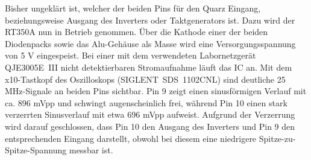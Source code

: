 \documentclass[]{article}
\begin{document}
	\noindent Bisher ungeklärt ist, welcher der beiden Pins für den Quarz Eingang, beziehungsweise Ausgang des Inverters oder Taktgenerators ist. %
	Dazu wird der RT350A nun in Betrieb genommen. Über die Kathode einer der beiden Diodenpacks sowie das Alu-Gehäuse als Masse wird eine Versorgungsspannung von 5 V eingespeist. Bei einer mit dem verwendeten Labornetzgerät QJE3005E~III nicht detektierbaren Stromaufnahme läuft das IC an. Mit dem x10-Tastkopf des Oszilloskops (SIGLENT~SDS~1102CNL) sind deutliche 25 MHz-Signale an beiden Pins sichtbar. Pin 9 zeigt einen sinusförmigen Verlauf mit ca. 896 mVpp und schwingt augenscheinlich frei, während Pin 10 einen stark verzerrten Sinusverlauf mit etwa 696 mVpp aufweist. Aufgrund der Verzerrung wird darauf geschlossen, dass Pin 10 den Ausgang des Inverters und Pin 9 den entsprechenden Eingang darstellt, obwohl bei diesem eine niedrigere Spitze-zu-Spitze-Spannung messbar ist.
	
\end{document}
